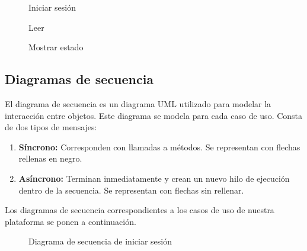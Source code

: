 \begin{figure}[!h]
\centering
\iniciarSesion\label{fig:iniciarSesion}
\caption{Iniciar sesión}
\end{figure}
\newpage

\begin{figure}[!h]
\centering
\leer\label{fig:leer}
\caption{Leer}
\end{figure}
\newpage

\begin{figure}[!h]
\centering
\mostrarEstado\label{fig:mostrarEstado}
\caption{Mostrar estado}
\end{figure}
\newpage

\subsection{Diagramas de secuencia}

El diagrama de secuencia es un diagrama UML utilizado para modelar la interacción entre objetos. Este diagrama se modela para cada caso de uso. Consta de dos tipos de mensajes:
\begin{enumerate}
	\item \textbf{Síncrono: }Corresponden con llamadas a métodos. Se representan con flechas rellenas en negro.
	\item \textbf{Asíncrono: }Terminan inmediatamente y crean un nuevo hilo de ejecución dentro de la secuencia. Se representan con flechas sin rellenar.
\end{enumerate}

Los diagramas de secuencia correspondientes a los casos de uso de nuestra plataforma se ponen a continuación.

\begin{figure}[!h]
\centering
\seqIniciarSesion
\caption{Diagrama de secuencia de iniciar sesión}
\end{figure}